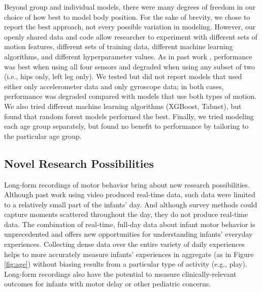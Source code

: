 \documentclass[
  man]{apa6}
\begin{document}
Beyond group and individual models, there were many degrees of freedom in our choice of how best to model body position. For the sake of brevity, we chose to report the best approach, not every possible variation in modeling. However, our openly shared data and code allow researcher to experiment with different sets of motion features, different sets of training data, different machine learning algorithms, and different hyperparameter values. As in past work \autocite{AiraksinenRasanen2020}, performance was best when using all four sensors and degraded when using any subset of two (i.e., hips only, left leg only). We tested but did not report models that used either only accelerometer data and only gyroscope data; in both cases, performance was degraded compared with models that use both types of motion. We also tried different machine learning algorithms (XGBoost, Tabnet), but found that random forest models performed the best. Finally, we tried modeling each age group separately, but found no benefit to performance by tailoring to the particular age group.

\hypertarget{novel-research-possibilities}{%
\subsection{Novel Research Possibilities}\label{novel-research-possibilities}}

Long-form recordings of motor behavior bring about new research possibilities. Although past work using video \autocite{Karasik2011,ChenSchneider2022,HerzbergFletcher2021} produced real-time data, such data were limited to a relatively small part of the infants' day. And although survey methods \autocite{Survey} could capture moments scattered throughout the day, they do not produce real-time data. The combination of real-time, full-day data about infant motor behavior is unprecedented and offers new opportunities for understanding infants' everyday experiences. Collecting dense data over the entire variety of daily experiences helps to more accurately measure infants' experiences in aggregate (as in Figure \ref{fig:age}) without biasing results from a particular type of activity (e.g., play). Long-form recordings also have the potential to measure clinically-relevant outcomes for infants with motor delay or other pediatric concerns.
\end{document}
